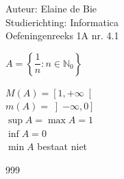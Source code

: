 \documentclass[a4paper]{article}
\begin{document}
	
\noindent \large Auteur: Elaine de Bie \\
\noindent \large Studierichting: Informatica\\
\noindent \large Oefeningenreeks 1A nr. 4.1\\
	
\medskip


\normalsize


$A =  \left\lbrace\dfrac{1}{n} : n\in\mathbb{N}_0\right\rbrace$\\

\medskip

$M(A) = \left[ 1, +\infty \right[$\\

$m(A) = \left]-\infty, 0 \right]$\\

$\sup A = \max A = 1$\\

$\inf A = 0$\\

$\min A $ bestaat niet\\




\begin{thebibliography}{999}
\end{thebibliography}
\end{document}
